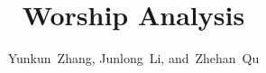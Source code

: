 \documentclass[journal]{IEEEtran}
\begin{document}
%
\title{Worship Analysis}


\author{Yunkun~Zhang,
        Junlong~Li,
        and~Zhehan~Qu}%

% 

% 
\end{document}
